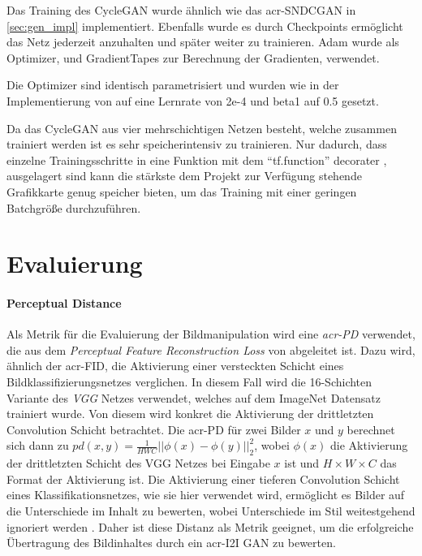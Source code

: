  Das Training des CycleGAN wurde ähnlich wie das \gls{acr-SNDCGAN} in \cref{sec:gen_impl} implementiert. Ebenfalls wurde es durch Checkpoints ermöglicht das Netz jederzeit anzuhalten und später weiter zu trainieren. Adam \cite{tf:adam} wurde als Optimizer, und GradientTapes \cite{tf:gradientape} zur Berechnung der Gradienten, verwendet.
 
Die Optimizer sind identisch parametrisiert und wurden wie in der Implementierung von \cite{brownlee_how_2019-1} auf eine Lernrate von 2e-4 und beta1 auf 0.5 gesetzt. 

Da das CycleGAN aus vier mehrschichtigen Netzen besteht, welche zusammen trainiert werden ist es sehr speicherintensiv zu trainieren. Nur dadurch, dass einzelne Trainingsschritte in eine Funktion mit dem \enquote{tf.function} decorater \cite{noauthor_tffunction_nodate}, ausgelagert sind kann die stärkste dem Projekt zur Verfügung stehende Grafikkarte genug speicher bieten, um das Training mit einer geringen Batchgröße durchzuführen. 


 \section{Evaluierung} %

 \paragraph{Perceptual Distance} Als Metrik für die Evaluierung der
 Bildmanipulation wird eine \emph{\gls{acr-PD}} \cite{pang2021image} verwendet, die aus dem
 \emph{Perceptual Feature Reconstruction Loss} von
 \citeauthor{johnson_perceptual_2016} \cite{johnson_perceptual_2016} abgeleitet ist. Dazu wird, ähnlich der
 \gls{acr-FID}, die Aktivierung einer versteckten Schicht eines
 Bildklassifizierungsnetzes verglichen. In diesem Fall wird die 16-Schichten
 Variante des \emph{VGG} Netzes \cite{simonyan2014very} verwendet, welches auf
 dem ImageNet \cite{russakovsky2015imagenet} Datensatz trainiert wurde. Von diesem
 wird konkret die Aktivierung der drittletzten Convolution Schicht betrachtet.
 Die \gls{acr-PD} für zwei Bilder $x$ und $y$ berechnet sich dann zu $pd(x,y) = \frac{1}{HWC}
 ||\phi(x) - \phi(y)||_2^{2}$, wobei $\phi(x)$ die Aktivierung der drittletzten
 Schicht des VGG Netzes bei Eingabe $x$ ist und $H \times W \times C$ das Format
 der Aktivierung ist. Die Aktivierung einer tieferen
 Convolution Schicht eines Klassifikationsnetzes, wie sie hier verwendet wird,
 ermöglicht es Bilder auf die Unterschiede im Inhalt zu bewerten, wobei
 Unterschiede im Stil weitestgehend ignoriert werden
 \cite{johnson_perceptual_2016,pang2021image}. Daher ist diese Distanz als
 Metrik geeignet, um die erfolgreiche Übertragung des Bildinhaltes durch ein
 \gls{acr-I2I} GAN zu bewerten.